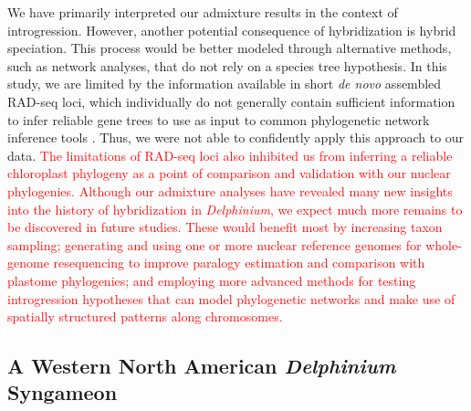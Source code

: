 \documentclass[11pt]{article}
\begin{document}
We have primarily interpreted our admixture results in the context of introgression. However, another potential consequence of hybridization is hybrid speciation.
% 
This process would be better modeled through alternative methods, such as network
analyses, that do not rely on a species tree hypothesis. 
% 
In this study, we are limited by the information available in short 
\emph{de novo} assembled RAD-seq loci, which individually do not 
generally contain sufficient information to infer reliable gene trees to use as input to common phylogenetic network inference tools \citep{solis-lemus_inferring_2016}.
% 
Thus, we were not able to confidently apply this approach to our data.
\textcolor{red}{The limitations of RAD-seq loci also inhibited us from inferring a reliable chloroplast phylogeny as a point of comparison and validation with our nuclear phylogenies.
% 
Although our admixture analyses have revealed many new insights into the history of 
hybridization in \emph{Delphinium}, we expect much more remains to be discovered in
future studies. 
These would benefit most by increasing taxon sampling; generating and using one or
more nuclear reference genomes for whole-genome resequencing to improve paralogy estimation and comparison with plastome phylogenies; and employing more advanced
methods for testing introgression hypotheses that can model phylogenetic networks
and make use of spatially structured patterns along chromosomes.}


\subsection{A Western North American \emph{Delphinium} Syngameon}
\end{document}
